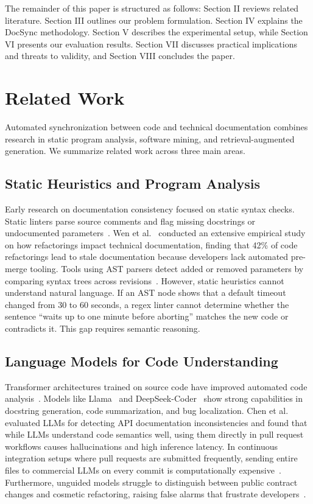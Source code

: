 \documentclass[12pt,onecolumn,draftclsnofoot]{IEEEtran}
\begin{document}
The remainder of this paper is structured as follows: Section II reviews related literature. Section III outlines our problem formulation. Section IV explains the DocSync methodology. Section V describes the experimental setup, while Section VI presents our evaluation results. Section VII discusses practical implications and threats to validity, and Section VIII concludes the paper.

\section{Related Work}
Automated synchronization between code and technical documentation combines research in static program analysis, software mining, and retrieval-augmented generation. We summarize related work across three main areas.

\subsection{Static Heuristics and Program Analysis}
Early research on documentation consistency focused on static syntax checks. Static linters parse source comments and flag missing docstrings or undocumented parameters~\cite{sadowski2015tricorder}. Wen et al.~\cite{wen2019refactoring} conducted an extensive empirical study on how refactorings impact technical documentation, finding that 42\% of code refactorings lead to stale documentation because developers lack automated pre-merge tooling. Tools using AST parsers detect added or removed parameters by comparing syntax trees across revisions~\cite{allamanis2018survey}. However, static heuristics cannot understand natural language. If an AST node shows that a default timeout changed from 30 to 60 seconds, a regex linter cannot determine whether the sentence ``waits up to one minute before aborting'' matches the new code or contradicts it. This gap requires semantic reasoning.

\subsection{Language Models for Code Understanding}
Transformer architectures trained on source code have improved automated code analysis~\cite{devlin2019bert}. Models like Llama~\cite{touvron2023llama} and DeepSeek-Coder~\cite{deepseekcoder2024} show strong capabilities in docstring generation, code summarization, and bug localization. Chen et al.~\cite{chen2024drift} evaluated LLMs for detecting API documentation inconsistencies and found that while LLMs understand code semantics well, using them directly in pull request workflows causes hallucinations and high inference latency. In continuous integration setups where pull requests are submitted frequently, sending entire files to commercial LLMs on every commit is computationally expensive~\cite{zhou2023eval}. Furthermore, unguided models struggle to distinguish between public contract changes and cosmetic refactoring, raising false alarms that frustrate developers~\cite{zhang2024review}.
\end{document}
